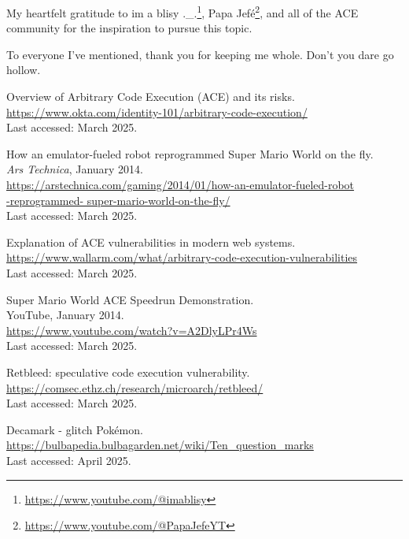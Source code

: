 \documentclass[a4paper]{usiinfbachelorproject}
\begin{document}
My heartfelt gratitude to im a blisy .\_.\footnote{\url{https://www.youtube.com/@imablisy}}, Papa Jefé\footnote{\url{https://www.youtube.com/@PapaJefeYT}}, and all of the ACE community for the inspiration to pursue this topic.

To everyone I've mentioned, thank you for keeping me whole. Don't you dare go hollow.

\newpage



\begin{thebibliography}{99}

	Overview of Arbitrary Code Execution (ACE) and its risks.\\
	\url{https://www.okta.com/identity-101/arbitrary-code-execution/}\\
	Last accessed: March 2025.

	How an emulator-fueled robot reprogrammed Super Mario World on the fly.\\
	\textit{Ars Technica}, January 2014.\\
	\url{https://arstechnica.com/gaming/2014/01/how-an-emulator-fueled-robot}
	\\\url{-reprogrammed-
		super-mario-world-on-the-fly/}\\
	Last accessed: March 2025.



	Explanation of ACE vulnerabilities in modern web systems.\\
	\url{https://www.wallarm.com/what/arbitrary-code-execution-vulnerabilities}\\
	Last accessed: March 2025.

	Super Mario World ACE Speedrun Demonstration.\\
	YouTube, January 2014.\\
	\url{https://www.youtube.com/watch?v=A2DlyLPr4Ws} \\
	Last accessed: March 2025.



	Retbleed: speculative code execution vulnerability.\\
	\url{https://comsec.ethz.ch/research/microarch/retbleed/}\\
	Last accessed: March 2025.

	Decamark - glitch Pokémon.\\
	\url{https://bulbapedia.bulbagarden.net/wiki/Ten_question_marks}  \\
	Last accessed: April 2025.




\end{thebibliography}
\end{document}
